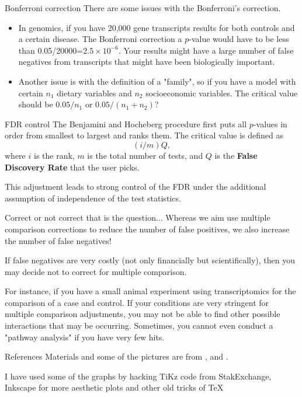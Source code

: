 \documentclass{beamer}
\begin{document}
\begin{frame}{Bonferroni correction}
	There are some issues with the Bonferroni's correction. 
	
	\begin{itemize}
		\item In genomics, if you have 20,000 gene transcripts results for both controls and a certain disease. The Bonferroni correction a $p$-value would have to be less than 0.05/20000=$2.5\times10^{-6}$. Your results might have a large number of false negatives from transcripts that might have been biologically important.
		\item Another issue is with the definition of a "family", so if you have a model with certain $n_1$ dietary variables and $n_2$ socioeconomic variables. The critical value should be $0.05/n_1$ or $0.05/(n_1+n_2)$?
	\end{itemize}
\end{frame}

\begin{frame}{FDR control}
	The Benjamini and Hocheberg procedure first puts all $p$-values in order from smallest to largest and ranks them. The critical value is defined as
	\begin{equation*}
		(i/m)Q,
	\end{equation*}
	where $i$ is the rank, $m$ is the total number of tests, and $Q$ is the \textbf{False Discovery Rate} that the user picks.
	
	This adjustment leads to strong control of the FDR under the additional assumption of independence of the test statistics.
\end{frame}

\begin{frame}{Correct or not correct that is the question...}
	Whereas we aim use multiple comparison corrections to reduce the number of false positives, we also increase the number of false negatives! 
	
	If false negatives are very costly (not only financially but scientifically), then you may decide not to correct for multiple comparison.
	
	For instance, if you have a small animal experiment using transcriptomics for the comparison of a case and control. If your conditions are very stringent for multiple comparison adjustments, you may not be able to find other possible interactions that may be occurring. Sometimes, you cannot even conduct a "pathway analysis" if you have very few hits. 
	 
\end{frame}

\begin{frame}{References}
	Materials and some of the pictures are from \citep{pestman}, \citep{macdonald} and \citep{speed}.
	\printbibliography 	
	
	I have used some of the graphs by hacking TiKz code from StakExchange, Inkscape for more aesthetic plots and other old tricks of \TeX
	
\end{frame}
\end{document}
